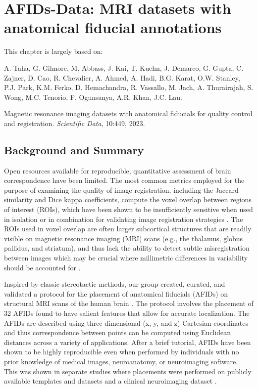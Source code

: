 \chapter{AFIDs-Data: MRI datasets with anatomical fiducial annotations}\label{chap:afidsdata}
\newpage
\sloppy
\noindent This chapter is largely based on:
\begin{itemize}[noitemsep,topsep=0pt]
    \begin{small}
    \item
    A. Taha, G. Gilmore, M. Abbass, J. Kai, T. Kuehn, J. Demarco, G. Gupta, C. Zajner, D. Cao, R. Chevalier, A. Ahmed, A. Hadi, B.G. Karat, O.W. Stanley, P.J. Park, K.M. Ferko, D. Hemachandra, R. Vassallo, M. Jach, A. Thurairajah, S. Wong, M.C. Tenorio, F. Ogunsanya, A.R. Khan, J.C. Lau.
    \end{small} Magnetic resonance imaging datasets with anatomical fiducials for quality control and registration. \textit{Scientific Data}, 10:449, 2023.
\end{itemize}

\section{Background and Summary}
Open resources available for reproducible, quantitative assessment of brain correspondence have been limited. The most common metrics employed for the purpose of examining the quality of image registration, including the Jaccard similarity and Dice kappa coefficients, compute the voxel overlap between regions of interest (ROIs), which have been shown to be insufficiently sensitive when used in isolation or in combination for validating image registration strategies \cite{Rohlfing2012-kt}. The ROIs used in voxel overlap are often larger subcortical structures that are readily visible on magnetic resonance imaging (MRI) scans (e.g., the thalamus, globus pallidus, and striatum), and thus lack the ability to detect subtle misregistration between images which may be crucial where millimetric differences in variability should be accounted for \cite{Rohlfing2012-kt,Lau2019-eh,Abbass2022-lf,Chakravarty2009-kq}.

Inspired by classic stereotactic methods, our group created, curated, and validated a protocol for the placement of anatomical fiducials (AFIDs) on structural MRI scans of the human brain \cite{Lau2019-eh}. The protocol involves the placement of 32 AFIDs found to have salient features that allow for accurate localization. The AFIDs are described using three-dimensional (x, y, and z) Cartesian coordinates and thus correspondence between points can be computed using Euclidean distances across a variety of applications. After a brief tutorial, AFIDs have been shown to be highly reproducible even when performed by individuals with no prior knowledge of medical images, neuroanatomy, or neuroimaging software. This was shown in separate studies where placements were performed on publicly available templates and datasets \cite{Lau2019-eh} and a clinical neuroimaging dataset \cite{Abbass2022-lf}.

